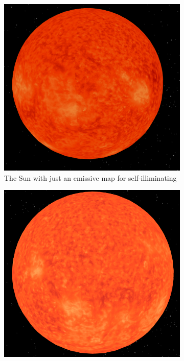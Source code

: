 \documentclass[12pt]{article}
\begin{document}
\begin{figure}[H]
        \centering
        \begin{subfigure}[b]{0.4\textwidth}
                \includegraphics[width=\textwidth]{images/sunemissive}
                \caption{The Sun with just an emissive map for self-illiminating}
                \label{fig:Self-illuminating Sun with emissive map.}
       \end{subfigure}
        \begin{subfigure}[b]{0.4\textwidth}
                \includegraphics[width=\textwidth]{images/sunemissiveandambient}

\end{subfigure}
\end{figure}
\end{document}
